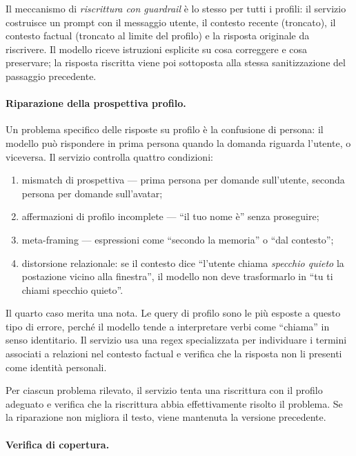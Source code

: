 Il meccanismo di \emph{riscrittura con guardrail} è lo stesso per tutti i profili: il servizio costruisce un prompt con il messaggio utente, il contesto recente (troncato), il contesto factual (troncato al limite del profilo) e la risposta originale da riscrivere. Il modello riceve istruzioni esplicite su cosa correggere e cosa preservare; la risposta riscritta viene poi sottoposta alla stessa sanitizzazione del passaggio precedente.

\paragraph{Riparazione della prospettiva profilo.}

Un problema specifico delle risposte su profilo è la confusione di persona: il modello può rispondere in prima persona quando la domanda riguarda l'utente, o viceversa. Il servizio controlla quattro condizioni:
\begin{enumerate}
\item mismatch di prospettiva --- prima persona per domande sull'utente, seconda persona per domande sull'avatar;
\item affermazioni di profilo incomplete --- ``il tuo nome è'' senza proseguire;
\item meta-framing --- espressioni come ``secondo la memoria'' o ``dal contesto'';
\item distorsione relazionale: se il contesto dice ``l'utente chiama \emph{specchio quieto} la postazione vicino alla finestra'', il modello non deve trasformarlo in ``tu ti chiami specchio quieto''.
\end{enumerate}

Il quarto caso merita una nota. Le query di profilo sono le più esposte a questo tipo di errore, perché il modello tende a interpretare verbi come ``chiama'' in senso identitario. Il servizio usa una regex specializzata per individuare i termini associati a relazioni nel contesto factual e verifica che la risposta non li presenti come identità personali.

Per ciascun problema rilevato, il servizio tenta una riscrittura con il profilo adeguato e verifica che la riscrittura abbia effettivamente risolto il problema. Se la riparazione non migliora il testo, viene mantenuta la versione precedente.

\paragraph{Verifica di copertura.}

